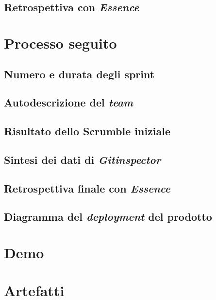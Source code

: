 \documentclass{article}
\begin{document}
\subsection{Retrospettiva con \emph{Essence}}

\section{Processo seguito}

\subsection{Numero e durata degli sprint}

\subsection{Autodescrizione del \emph{team}}

\subsection{Risultato dello Scrumble iniziale}

\subsection{Sintesi dei dati di \emph{Gitinspector}}

\subsection{Retrospettiva finale con \emph{Essence}}

\subsection{Diagramma del \emph{deployment} del prodotto}

\section{Demo}

\section{Artefatti}
\end{document}
